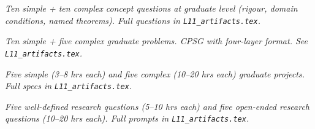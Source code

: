 \begin{tcolorbox}[gradconceptbox, title={SCQG + CCQG · L11 · Tiers 4–5}]
\textit{Ten simple + ten complex concept questions at graduate level (rigour, domain
conditions, named theorems). Full questions in \texttt{L11_artifacts.tex}.}
\end{tcolorbox}

\begin{tcolorbox}[gradprobbox, title={SPSG + CPSG · L11 · Tiers 4–5}]
\textit{Ten simple + five complex graduate problems.
CPSG with four-layer format. See \texttt{L11_artifacts.tex}.}
\end{tcolorbox}

\begin{tcolorbox}[gradprobbox, title={SPJG (×5) + CPJG (×5) · L11 · Tiers 4–5}]
\textit{Five simple (3–8 hrs each) and five complex (10–20 hrs each) graduate projects.
Full specs in \texttt{L11_artifacts.tex}.}
\end{tcolorbox}

\begin{tcolorbox}[researchbox, title={WRQ (×5) + ORQ (×5) · L11 · Tiers 4–5}]
\textit{Five well-defined research questions (5–10 hrs each) and five open-ended
research questions (10–20 hrs each). Full prompts in \texttt{L11_artifacts.tex}.}
\end{tcolorbox}
